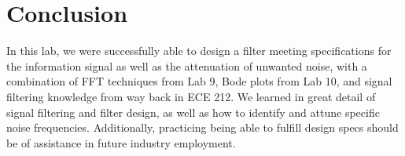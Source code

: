 \documentclass[11pt,a4,titlepage]{article}
\begin{document}
\section{Conclusion}
In this lab, we were successfully able to design a filter meeting specifications for the information signal as well as the attenuation of unwanted noise, with a combination of FFT techniques from Lab 9, Bode plots from Lab 10, and signal filtering knowledge from way back in ECE 212. We learned in great detail of signal filtering and filter design, as well as how to identify and attune specific noise frequencies. Additionally, practicing being able to fulfill design specs should be of assistance in future industry employment.
\end{document}
